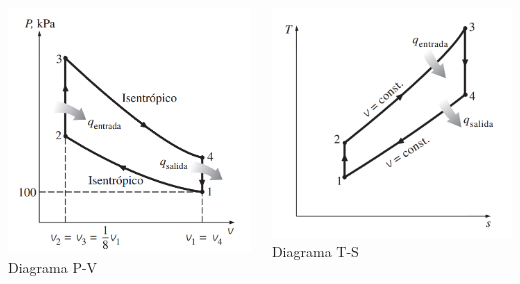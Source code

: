 \documentclass{beamer}
\begin{document}
\begin{frame}
    \begin{columns}[T]
        \begin{column}{0.5\textwidth}
            \centering
            \includegraphics[width=\textwidth]{diagrama-PV-Otto.png}
            \tiny{Diagrama P-V}
        \end{column}
        \begin{column}{0.5\textwidth}
            \centering
            \includegraphics[width=\textwidth]{diagrama-TS-Otto.png}
            \tiny{Diagrama T-S}
        \end{column}
    \end{columns}
    

\end{frame}
\end{document}

